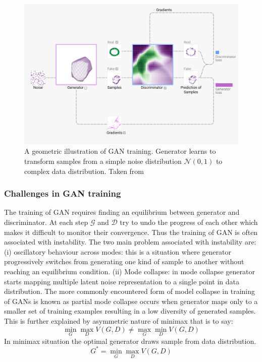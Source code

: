 \begin{figure}
    \centering
    \includegraphics[width=0.75\columnwidth]{master_thesis_template/figs/gan_training.PNG}
    \caption{A geometric illustration of GAN training. Generator learns to transform samples from a simple noise distribution $\mathcal{N}(0,1)$ to complex data distribution. Taken from~\cite{kahng2018gan}}
    \label{fig:gan_train}
\end{figure}
\subsubsection{Challenges in GAN training}
The training of GAN requires finding an equilibrium between generator and discriminator. At each step $\mathcal{G}$ and $\mathcal{D}$ try to undo the progress of each other which makes it difficult to monitor their convergence. Thus the training of GAN is often associated with instability. The two main problem associated with instability are: (i) oscillatory behaviour across modes: this is a situation where generator progressively switches from generating one kind of sample to another without reaching an equilibrium condition. (ii) Mode collapse: in mode collapse generator starts mapping multiple latent noise representation to a single point in data distribution. The more commonly encountered form of model collapse in training of GANs is known as partial mode collapse occurs when generator maps only to a smaller set of training examples resulting in a low diversity of generated samples. This is further explained by asymmetric nature of minimax that is to say:
\begin{equation}
\min_G \max_D V(G,D) \neq \max_G \min_D V(G,D)
\end{equation}
In minimax situation the optimal generator draws sample from data distribution. 
\begin{equation}
    G^\ast = \min_G \max_D V(G,D)
\end{equation}


